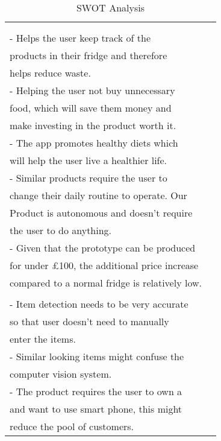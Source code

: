\begin{longtable}[c]{|l|l|}
    \caption{SWOT Analysis}
    \label{tab:swot}\\
    \hline
    \begin{tabular}[c]{@{}l@{}}Strengths:\\    \\ - Helps the user  keep track of the \\ products in their  fridge and therefore\\ helps reduce waste.\\ - Helping the  user not buy unnecessary\\ food, which will save them money and \\ make   investing in the product worth it.  \\ - The app  promotes healthy diets which\\ will help the user live a healthier life.\\ - Similar   products require the user to\\ change their daily routine to operate. Our \\ Product is autonomous and doesn't require\\ the user to do anything.\\ - Given that the  prototype can be produced\\ for under £100, the additional price increase\\ compared to a  normal fridge is relatively low.\end{tabular} &
      \begin{tabular}[c]{@{}l@{}}Weakness:\\    \\ - Item detection needs to be very accurate \\ so that user doesn't need to manually\\ enter the items.\\ - Similar looking items might confuse the \\ computer vision system.\\ - The product requires the user to own a\\ and want to use smart phone, this might\\ reduce the pool of customers.\end{tabular} \\ \hline

\end{longtable}
